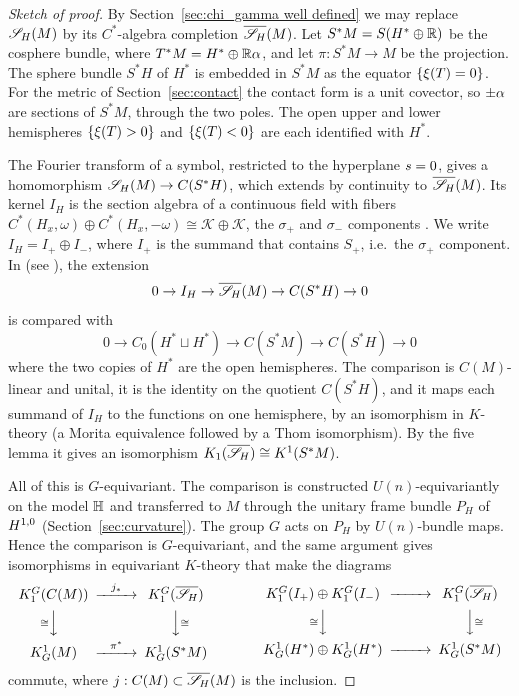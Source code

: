 \documentclass[11pt]{amsart}
\theoremstyle{plain}
\theoremstyle{definition}
\theoremstyle{remark}
\begin{document}
\begin{proof}[Sketch of proof]
By Section~\ref{sec:chi_gamma well defined} we may replace ${\mathscr{S}_H}(M)$ by its $C^*$-algebra completion $\overline{{\mathscr{S}_H}}(M)$.
Let $S^*M=S(H^*\oplus{\mathbb{R}})$ be the cosphere bundle, where $T^*M=H^*\oplus{\mathbb{R}}\alpha$, and let $\pi:S^*M\to M$ be the projection.
The sphere bundle $S^*H$ of $H^*$ is embedded in $S^*M$ as the equator $\{\xi(T)=0\}$.
For the metric of Section~\ref{sec:contact} the contact form is a unit covector, so $\pm\alpha$ are sections of $S^*M$, through the two poles.
The open upper and lower hemispheres $\{\xi(T)>0\}$ and $\{\xi(T)<0\}$ are each identified with $H^*$.

The Fourier transform of a symbol, restricted to the hyperplane $s=0$, gives a homomorphism ${\mathscr{S}_H}(M)\to C(S^*H)$, which extends by continuity to $\overline{{\mathscr{S}_H}}(M)$.
Its kernel $I_H$ is the section algebra of a continuous field with fibers $C^*(H_x,\omega)\oplus C^*(H_x,-\omega)\cong\mathcal K\oplus\mathcal K$, the $\sigma_+$ and $\sigma_-$ components \cite[Section~8]{GvE20}.
We write $I_H=I_+\oplus I_-$, where $I_+$ is the summand that contains $S_+$, i.e.\ the $\sigma_+$ component.
In \cite[Section~8]{GvE20} (see \cite[Section~4.6, Proposition~4.6.1]{BvE14}), the extension
\[ 0\to I_H\to\overline{{\mathscr{S}_H}}(M)\to C(S^*H)\to0\]
is compared with
\[ 0\to C_0(H^*\sqcup H^*)\to C(S^*M)\to C(S^*H)\to0\]
where the two copies of $H^*$ are the open hemispheres.
The comparison is $C(M)$-linear and unital, it is the identity on the quotient $C(S^*H)$, and it maps each summand of $I_H$ to the functions on one hemisphere, by an isomorphism in $K$-theory (a Morita equivalence followed by a Thom isomorphism).
By the five lemma it gives an isomorphism $K_1(\overline{{\mathscr{S}_H}})\cong K^1(S^*M)$.

All of this is $G$-equivariant.
The comparison is constructed $U(n)$-equivariantly on the model $\mathbb{H}$ and transferred to $M$ through the unitary frame bundle $P_H$ of $H^{1,0}$ (Section~\ref{sec:curvature}).
The group $G$ acts on $P_H$ by $U(n)$-bundle maps.
Hence the comparison is $G$-equivariant, and the same argument gives isomorphisms in equivariant $K$-theory that make the diagrams
\[
\begin{CD}
K_1^G(C(M)) @>{j_*}>> K_1^G(\overline{\Symb})\\
@V{\cong}VV @VV{\cong}V\\
K^1_G(M) @>{\pi^*}>> K^1_G(S^*M)
\end{CD}
\qquad\qquad
\begin{CD}
K_1^G(I_+)\oplus K_1^G(I_-) @>>> K_1^G(\overline{\Symb})\\
@V{\cong}VV @VV{\cong}V\\
K^1_G(H^*)\oplus K^1_G(H^*) @>>> K^1_G(S^*M)
\end{CD}
\]
commute, where $j:C(M)\subset\overline{{\mathscr{S}_H}}(M)$ is the inclusion.


\end{proof}
\end{document}
